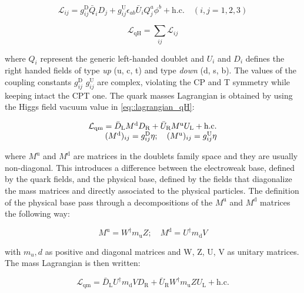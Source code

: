 \begin{equation}
\mathcal{L}_{ij} = g^{\text{D}}_{ij}\bar{Q}_{i}D_{j} + g^{\text{U}}_{ij}\epsilon_{ab}\bar{U}_{i}Q^{a}_{j}\phi^{b} + \text{h.c.} \quad (i,j = 1,2,3)
\end{equation}

\begin{equation}
\mathcal{L}_{\text{qH}} = \sum_{ij}\mathcal{L}_{ij}
\label{eq::lagrangian_qH}
\end{equation}

where $Q_{i}$ represent the generic left-handed doublet and $U_{i}$ and $D_{i}$ defines the right handed fields of type \textit{up} (u, c, t) and type \textit{down} (d, s, b). The values of the coupling constants $g^{\text{D}}_{ij}$ $g^{\text{U}}_{ij}$ are complex, violating the CP and T symmetry while keeping intact the CPT one.
The quark masses Lagrangian is obtained by using the Higgs field vacuum value in \autoref{eq::lagrangian_qH}:

\begin{equation}
\begin{array}{r c l}
\mathcal{L}_{\text{qm}} = \bar{D}_{\text{L}}M^{\text{d}}D_{\text{R}} + \bar{U}_{\text{R}}M^{\text{u}}U_{\text{L}} + \text{h.c.} \\
(M^{\text{d}})_{ij} = g^{\text{D}}_{ij}\eta; \quad (M^{\text{u}})_{ij} = g^{\text{U}}_{ij}\eta
\end{array}
\end{equation}

where $M^{\text{u}}$ and  $M^{\text{d}}$ are matrices in the doublets family space and they are usually non-diagonal. This introduces a difference between the electroweak base, defined by the quark fields, and the physical base, defined by the fields that diagonalize the mass matrices and directly associated to the physical particles.
The definition of the physical base pass through a decompositions of the $M^{\text{u}}$ and $M^{\text{d}}$ matrices the following way:

\begin{equation}
M^{\text{u}} = W^{\dagger}m_{\text{u}}Z; \quad M^{\text{d}} = U^{\dagger}m_{\text{d}}V
\end{equation}

with $m_u,d$ as positive and diagonal matrices and W, Z, U, V as unitary matrices. The mass Lagrangian is then written:

\begin{equation}
\mathcal{L}_{\text{qm}} = \bar{D}_{\text{L}}U^{\dagger}m_{\text{d}}VD_{\text{R}} + \bar{U}_{\text{R}}W^{\dagger}m_{\text{u}}ZU_{\text{L}} + \text{h.c.}
\end{equation}

